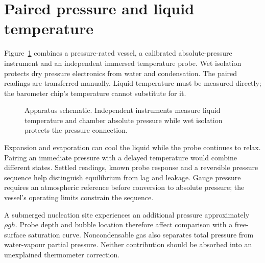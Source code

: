 \section{Paired pressure and liquid temperature}
Figure~\ref{fig:pressure-boiling-apparatus} combines a pressure-rated vessel, a calibrated absolute-pressure instrument and an independent immersed temperature probe. Wet isolation protects dry pressure electronics from water and condensation. The paired readings are transferred manually. Liquid temperature must be measured directly; the barometer chip's temperature cannot substitute for it.

\begin{figure}[t]
\centering
{}
\caption{Apparatus schematic. Independent instruments measure liquid temperature and chamber absolute pressure while wet isolation protects the pressure connection.}
\label{fig:pressure-boiling-apparatus}
\end{figure}

Expansion and evaporation can cool the liquid while the probe continues to relax. Pairing an immediate pressure with a delayed temperature would combine different states. Settled readings, known probe response and a reversible pressure sequence help distinguish equilibrium from lag and leakage. Gauge pressure requires an atmospheric reference before conversion to absolute pressure; the vessel's operating limits constrain the sequence.

A submerged nucleation site experiences an additional pressure approximately $\rho gh$. Probe depth and bubble location therefore affect comparison with a free-surface saturation curve. Noncondensable gas also separates total pressure from water-vapour partial pressure. Neither contribution should be absorbed into an unexplained thermometer correction.

